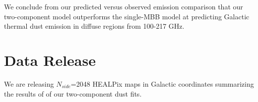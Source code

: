 \documentclass{emulateapj}
\newcommand{\PLANCK}{{\it Planck}}
\begin{document}
We conclude from our predicted versus observed emission comparison that our 
two-component model outperforms the \cite{planckdust} single-MBB model at 
predicting Galactic thermal dust emission in diffuse regions from 100-217 GHz. 





\section{Data Release}
\label{sec:release}
We are releasing $N_{side}$=2048 HEALPix maps in Galactic coordinates 
summarizing the results of of our two-component dust fits.




\begin{figure*} [ht]
\begin{center}
\caption{\label{fig:results} (top) Hot dust temperature derived from our 
full-resolution two-component model fits of \PLANCK~217-857 GHz and SFD 
\texttt{i100}, downbinned to 27.5$'$ resolution. (bottom) Corresponding
full-sky map of best-fit 545 GHz optical depth.}
\end{center}
\end{figure*}
\end{document}
